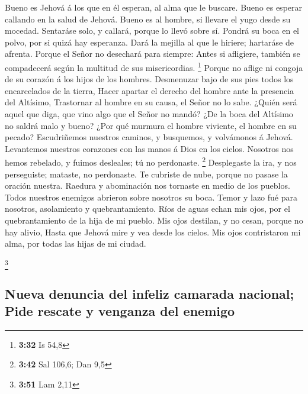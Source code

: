  Bueno es Jehová á los que en él esperan, al alma que le
buscare.  Bueno es esperar callando en la salud de Jehová.
 Bueno es al hombre, si llevare el yugo desde su mocedad.
 Sentaráse solo, y callará, porque lo llevó sobre sí.
 Pondrá su boca en el polvo, por si quizá hay esperanza.
 Dará la mejilla al que le hiriere; hartaráse de afrenta.
 Porque el Señor no desechará para siempre: 
Antes si afligiere, también se compadecerá según la multitud de sus
misericordias. \footnote{\textbf{3:32} Is 54,8}  Porque no
aflige ni congoja de su corazón á los hijos de los hombres.
 Desmenuzar bajo de sus pies todos los encarcelados de la
tierra,  Hacer apartar el derecho del hombre ante la
presencia del Altísimo,  Trastornar al hombre en su causa,
el Señor no lo sabe.  ¿Quién será aquel que diga, que vino
algo que el Señor no mandó?  ¿De la boca del Altísimo no
saldrá malo y bueno?  ¿Por qué murmura el hombre viviente,
el hombre en su pecado?  Escudriñemos nuestros caminos, y
busquemos, y volvámonos á Jehová.  Levantemos nuestros
corazones con las manos á Dios en los cielos.  Nosotros nos
hemos rebelado, y fuimos desleales; tú no perdonaste. \footnote{\textbf{3:42}
  Sal 106,6; Dan 9,5}  Desplegaste la ira, y nos
perseguiste; mataste, no perdonaste.  Te cubriste de nube,
porque no pasase la oración nuestra.  Raedura y abominación
nos tornaste en medio de los pueblos.  Todos nuestros
enemigos abrieron sobre nosotros su boca.  Temor y lazo fué
para nosotros, asolamiento y quebrantamiento.  Ríos de
aguas echan mis ojos, por el quebrantamiento de la hija de mi pueblo.
 Mis ojos destilan, y no cesan, porque no hay alivio,
 Hasta que Jehová mire y vea desde los cielos.
 Mis ojos contristaron mi alma, por todas las hijas de mi
ciudad.

\footnote{\textbf{3:51} Lam 2,11}

\hypertarget{nueva-denuncia-del-infeliz-camarada-nacional-pide-rescate-y-venganza-del-enemigo}{%
\subsection{Nueva denuncia del infeliz camarada nacional; Pide rescate y
venganza del
enemigo}\label{nueva-denuncia-del-infeliz-camarada-nacional-pide-rescate-y-venganza-del-enemigo}}

